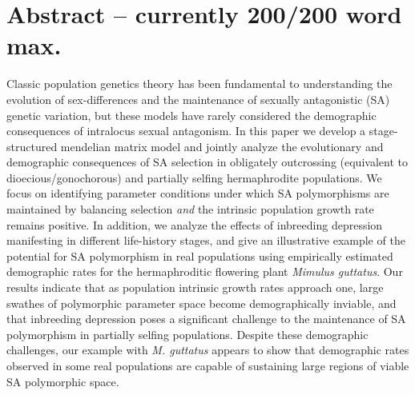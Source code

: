 \documentclass[11pt,draft]{article}
\begin{document}
\newpage{}
\section*{Abstract -- currently 200/200 word max.}%

Classic population genetics theory has been fundamental to understanding the evolution of sex-differences and the maintenance of sexually antagonistic (SA) genetic variation, but these models have rarely considered the demographic consequences of intralocus sexual antagonism. In this paper we develop a stage-structured mendelian matrix model and jointly analyze the evolutionary and demographic consequences of SA selection in obligately outcrossing (equivalent to dioecious/gonochorous) and partially selfing hermaphrodite populations. We focus on identifying parameter conditions under which SA polymorphisms are maintained by balancing selection {\itshape and} the intrinsic population growth rate remains positive. In addition, we analyze the effects of inbreeding depression manifesting in different life-history stages, and give an illustrative example of the potential for SA polymorphism in real populations using empirically estimated demographic rates for the hermaphroditic flowering plant {\itshape Mimulus guttatus}. Our results indicate that as population intrinsic growth rates approach one, large swathes of polymorphic parameter space become demographically inviable, and that inbreeding depression poses a significant challenge to the maintenance of SA polymorphism in partially selfing populations. Despite these demographic challenges, our example with {\itshape M. guttatus} appears to show that demographic rates observed in some real populations are capable of sustaining large regions of viable SA polymorphic space.
\end{document}
